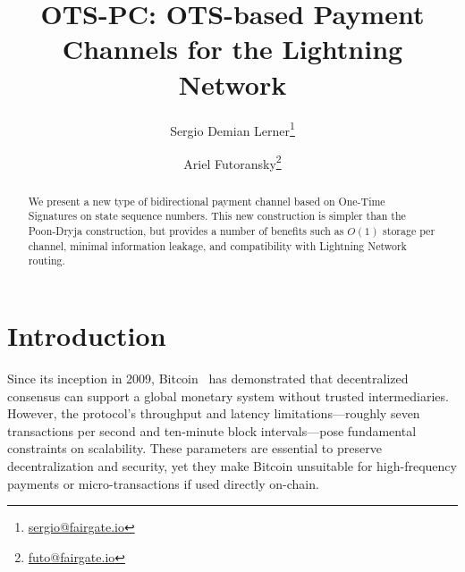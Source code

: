 \documentclass[11pt,a4paper]{article}
\title{OTS-PC: OTS-based Payment Channels for the Lightning Network}
\author[1,2]{Sergio Demian Lerner\thanks{\href{mailto:sergio@fairgate.io}{sergio@fairgate.io}}\hspace{3pt}} %
\author[1]{Ariel Futoransky\thanks{\href{mailto:futo@fairgate.io}{futo@fairgate.io}}\hspace{3pt}} %
\affil[1]{Fairgate Labs} %
\affil[2]{Rootstock Labs}
\date{}
\begin{document}
\maketitle

\begin{abstract}
We present a new type of bidirectional payment channel based on One-Time Signatures on state sequence numbers. This new construction is simpler than the Poon-Dryja construction, but provides a number of benefits such as $O(1)$ storage per channel, minimal information leakage, and compatibility with Lightning Network routing.

\end{abstract}






\section{Introduction}

Since its inception in 2009, Bitcoin~\cite{nakamoto2008bitcoin} has demonstrated that decentralized consensus can support a global monetary system without trusted intermediaries. However, the protocol’s throughput and latency limitations—roughly seven transactions per second and ten-minute block intervals—pose fundamental constraints on scalability. These parameters are essential to preserve decentralization and security, yet they make Bitcoin unsuitable for high-frequency payments or micro-transactions if used directly on-chain.
\end{document}
